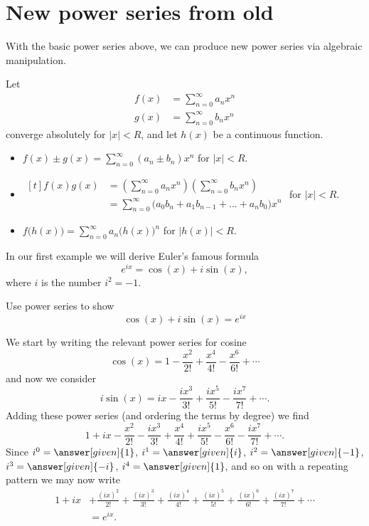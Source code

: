 \documentclass{ximera}
\begin{document}
\section{New power series from old}

With the basic power series above, we can produce new power series via
algebraic manipulation.

\begin{theorem}
  Let
  \begin{align*}
    f(x) &= \sum_{n=0}^\infty a_nx^n\\
    g(x) &= \sum_{n=0}^\infty b_nx^n
  \end{align*}
  converge absolutely for $|x|<R$, and let $h(x)$ be a continuous function.
  \begin{itemize}
	\item $f(x)\pm g(x) = \sum_{n=0}^\infty (a_n\pm b_n)x^n$ \quad for $|x|<R$.
	\item $\begin{aligned}[t]
	f(x)g(x) &= \left(\sum_{n=0}^\infty a_nx^n\right)\left(\sum_{n=0}^\infty b_nx^n\right)\\
	      &= \sum_{n=0}^\infty\big(a_0b_n+a_1b_{n-1}+\dots + a_nb_0\big)x^n
		\end{aligned}$ for $|x|<R$.%
	\item $f\big(h(x)\big) = \sum_{n=0}^\infty a_n\big(h(x)\big)^n$ \quad for $|h(x)|<R$.
  \end{itemize}
\end{theorem}

In our first example we will derive Euler's famous formula
\[
e^{ix} = \cos(x) + i \sin(x),
\]
where $i$ is the number $i^2=-1$.

\begin{example}
  Use power series to show
  \[
  \cos(x) + i \sin(x) = e^{ix} 
  \]
  \begin{explanation}
    We start by writing the relevant power series for cosine
    \[
    \cos(x) = 1-\frac{x^2}{2!} + \frac{x^4}{4!} -\frac{x^6}{6!} + \cdots
    \]
    and now we consider
    \[
    i \sin(x) = ix - \frac{ix^3}{3!} + \frac{ix^5}{5!} -\frac{i x^7}{7!} + \cdots.
    \]
    Adding these power series (and ordering the terms by degree) we find
    \[
    1+ ix -\frac{x^2}{2!} - \frac{ix^3}{3!} + \frac{x^4}{4!} + \frac{ix^5}{5!} -\frac{x^6}{6!} -\frac{i x^7}{7!} + \cdots.
    \]
    Since $i^0=\answer[given]{1}$,
    $i^1= \answer[given]{i}$,
    $i^2 = \answer[given]{-1}$,
    $i^3 = \answer[given]{-i}$,
    $i^4 = \answer[given]{1}$, and so on with a repeating pattern we may now write
    \begin{align*}
      1+ ix &+\frac{(ix)^2}{2!} + \frac{(ix)^3}{3!} + \frac{(ix)^4}{4!} + \frac{(ix)^5}{5!} +\frac{(ix)^6}{6!} +\frac{(i x)^7}{7!} + \cdots\\
      &= e^{ix}.
    \end{align*}
  \end{explanation}
\end{example}
\end{document}
